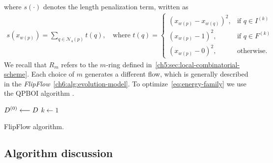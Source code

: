 where $s(\cdot)$ denotes the length penalization term, written as
\begin{align}
  s(x_{w(p)})=\sum_{q \in \mathcal{N}_4(p)}{ t(q) }, \quad \text{where } t(q) = \left\{\begin{array}{ll}
  (x_{w(p)}-x_{w(q)})^2, & \text{if } q \in I^{(k)}\\
  (x_{w(p)}-1)^2, & \text{if } q \in F^{(k)}\\
  (x_{w(p)}-0)^2, & \text{otherwise. }
  \end{array}\right.
  \label{eq:length-penalization}
\end{align}
%
%
We recall that $R_m$ refers to the $m$-ring defined in~\cref{ch5:sec:local-combinatorial-scheme}. Each choice of $m$ generates a different flow, which is generally described in the \emph{FlipFlow}~\cref{ch6:alg:evolution-model}. To optimize~\cref{eq:energy-family} we use the QPBOI algorithm \cite{rother07qpbo}.


\begin{algorithm}
 
 \BlankLine
 $D^{(0)} \longleftarrow D$\;
 $k \longleftarrow 1$\;
 \caption{FlipFlow algorithm.}
 \label{ch6:alg:evolution-model}  
\end{algorithm}

\subsection{Algorithm discussion}
\label{ch6:subsec:flipflow-algorithm-discussion}

